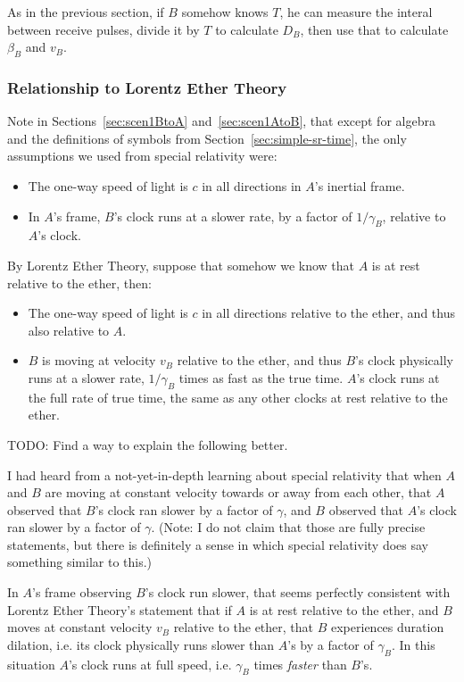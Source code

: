 \documentclass[a4paper]{article}
\theoremstyle{plain}
\theoremstyle{definition}
\begin{document}
As in the previous section, if $B$ somehow knows $T$,
he can measure the interal between receive pulses,
divide it by $T$ to calculate $D_B$,
then use that to calculate $\beta_B$ and $v_B$.


\subsubsection{Relationship to Lorentz Ether Theory}
\label{sec:scen1LET}

Note in Sections~\ref{sec:scen1BtoA} and~\ref{sec:scen1AtoB}, that
except for algebra and the definitions of symbols from
Section~\ref{sec:simple-sr-time}, the only assumptions we used from special relativity were:
\begin{itemize}
\item The one-way speed of light is $c$ in all directions in $A$'s
  inertial frame.
\item In $A$'s frame, $B$'s clock runs at a slower rate, by a factor
  of $1/\gamma_B$, relative to $A$'s clock.
\end{itemize}
By Lorentz Ether Theory, suppose that somehow we know that $A$ is at
rest relative to the ether, then:
\begin{itemize}
\item The one-way speed of light is $c$ in all directions relative to
  the ether, and thus also relative to $A$.
\item $B$ is moving at velocity $v_B$ relative to the ether, and thus
  $B$'s clock physically runs at a slower rate, $1/\gamma_B$ times as
  fast as the true time.  $A$'s clock runs at the full rate of true
  time, the same as any other clocks at rest relative to the ether.
\end{itemize}

TODO: Find a way to explain the following better.

I had heard from a not-yet-in-depth learning about special relativity
that when $A$ and $B$ are moving at constant velocity towards or away
from each other, that $A$ observed that $B$'s clock ran slower by a
factor of $\gamma$, and $B$ observed that $A$'s clock ran slower by a
factor of $\gamma$.  (Note: I do not claim that those are fully
precise statements, but there is definitely a sense in which special
relativity does say something similar to this.)

In $A$'s frame observing $B$'s clock run slower, that seems perfectly
consistent with Lorentz Ether Theory's statement that if $A$ is at
rest relative to the ether, and $B$ moves at constant velocity $v_B$
relative to the ether, that $B$ experiences duration dilation,
i.e. its clock physically runs slower than $A$'s by a factor of
$\gamma_B$.  In this situation $A$'s clock runs at full speed,
i.e. $\gamma_B$ times {\em faster} than $B$'s.
\end{document}
